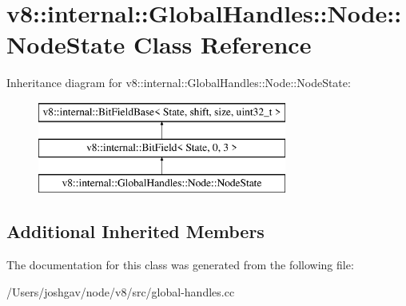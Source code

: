 \hypertarget{classv8_1_1internal_1_1_global_handles_1_1_node_1_1_node_state}{}\section{v8\+:\+:internal\+:\+:Global\+Handles\+:\+:Node\+:\+:Node\+State Class Reference}
\label{classv8_1_1internal_1_1_global_handles_1_1_node_1_1_node_state}
Inheritance diagram for v8\+:\+:internal\+:\+:Global\+Handles\+:\+:Node\+:\+:Node\+State\+:\begin{figure}[H]
\begin{center}
\leavevmode
\includegraphics[height=3.000000cm]{classv8_1_1internal_1_1_global_handles_1_1_node_1_1_node_state}
\end{center}
\end{figure}
\subsection*{Additional Inherited Members}


The documentation for this class was generated from the following file\+:\begin{DoxyCompactItemize}
\item 
/\+Users/joshgav/node/v8/src/global-\/handles.\+cc\end{DoxyCompactItemize}
